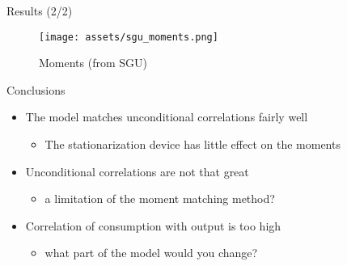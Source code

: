 \documentclass[
  ignorenonframetext,
]{beamer}
\providecommand{\tightlist}{%
  \setlength{\itemsep}{0pt}\setlength{\parskip}{0pt}}\usepackage{longtable,booktabs,array}
\begin{document}
\begin{frame}{Results (2/2)}
\label{results-22}
\begin{figure}[H]

{\centering \texttt{[image: assets/sgu\_moments.png]}

}

\caption{Moments (from SGU)}

\end{figure}%
\end{frame}

\begin{frame}{Conclusions}
\label{conclusions}
\begin{itemize}
\tightlist
\item
  The model matches unconditional correlations fairly well

  \begin{itemize}
  \tightlist
  \item
    The stationarization device has little effect on the moments
  \end{itemize}
\item
  Unconditional correlations are not that great

  \begin{itemize}
  \tightlist
  \item
    a limitation of the moment matching method?
  \end{itemize}
\item
  Correlation of consumption with output is too high

  \begin{itemize}
  \tightlist
  \item
    what part of the model would you change?
  \end{itemize}
\end{itemize}
\end{frame}
\end{document}
